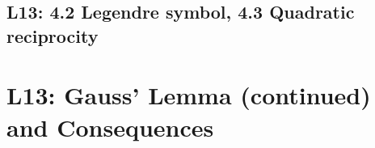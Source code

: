 \documentclass[10pt]{article}
\theoremstyle{definition}
\theoremstyle{plain}
\numberwithin{equation}{section}
\begin{document}
\subsection{L13: 4.2 Legendre symbol, 4.3 Quadratic reciprocity}

\section*{L13: Gauss' Lemma (continued) and Consequences}
\end{document}

